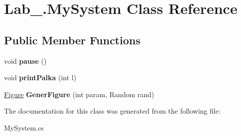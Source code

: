 \hypertarget{class_lab__3_1_1_my_system}{}\section{Lab\+\_.\+My\+System Class Reference}
\label{class_lab__3_1_1_my_system}
\subsection*{Public Member Functions}
\begin{DoxyCompactItemize}
\item 
\mbox{\label{class_lab__3_1_1_my_system_af5ddf1a60313be72cbc1455fd5a92d07}} 
void {\bfseries pause} ()
\item 
\mbox{\label{class_lab__3_1_1_my_system_a35082095f042f3adfce8683da117ebb9}} 
void {\bfseries print\+Palka} (int l)
\item 
\mbox{\label{class_lab__3_1_1_my_system_af9f46e3d19237b659c7e51453fb57323}} 
\hyperlink{class_lab__3_1_1_figure}{Figure} {\bfseries Gener\+Figure} (int param, Random rand)
\end{DoxyCompactItemize}


The documentation for this class was generated from the following file\+:\begin{DoxyCompactItemize}
\item 
My\+System.\+cs\end{DoxyCompactItemize}
